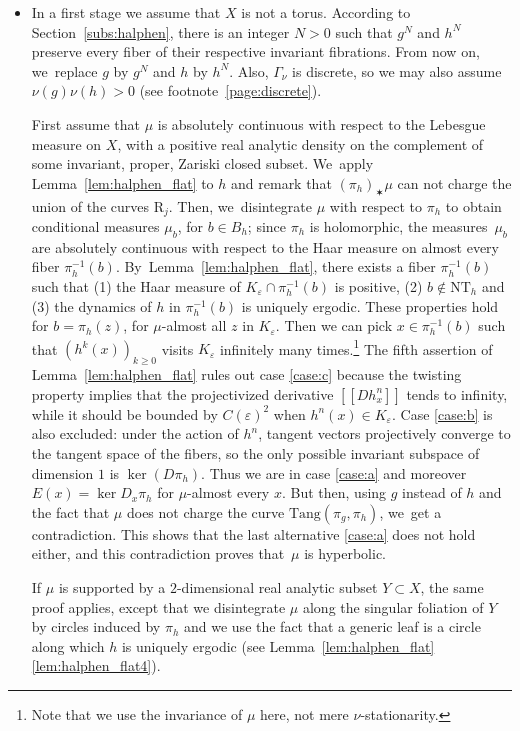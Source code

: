\documentclass[11pt]{article}
\newcommand{\llbracket}{[\![}
\newcommand{\rrbracket}{]\!]}
\let\e\varepsilon
\newcommand{\inv}{^{-1}}
\newcommand{\Tang}{{\mathrm{Tang}}}
\theoremstyle{plain}
\theoremstyle{definition}
\numberwithin{equation}{section}
\begin{document}
\begin{itemize}
\item
In a first stage we assume that $X$ is not a torus. According to Section~\ref{subs:halphen}, there is an integer $N>0$ such that $g^N$ and $h^N$
preserve every fiber of their respective invariant fibrations. From now on, we~replace $g$ by $g^N$ and $h$ by $h^N$. Also, $\Gamma_\nu$ is discrete, so we may also assume $\nu(g)\nu(h)>0$ (see footnote~\ref{page:discrete}).

First assume that $\mu$ is absolutely continuous with respect to the Lebesgue measure on $X$, with a positive real analytic density
on the complement of some invariant, proper, Zariski closed subset. We~apply Lemma~\ref{lem:halphen_flat} to $h$ and remark that
$(\pi_h)_\varstar \mu$ can not charge the union of the curves $\mathrm R_j$. Then, we~disintegrate $\mu$ with respect to $\pi_h$ to obtain
conditional measures $\mu_b$, for $b\in B_h$; since $\pi_h$ is holomorphic, the measures~$\mu_b$ are
absolutely continuous with respect to the Haar measure on almost every fiber $\pi_h^{-1}(b)$. By~Lemma~\ref{lem:halphen_flat},
there exists a fiber $\pi_h\inv(b)$ such that (1) the Haar measure of
$K_\varepsilon \cap \pi_h\inv(b)$ is positive,
(2) $b \notin \mathrm{NT}_h$ and (3)
the dynamics of $h$ in $\pi_h\inv(b)$ is uniquely ergodic. These properties hold for $b=\pi_h(z)$, for $\mu$-almost all $z$ in $K_\e$.
Then we can pick $x\in \pi_h\inv(b)$ such that $(h^{k}(x))_{k\geq 0}$ visits $K_\e$ infinitely many times.\footnote{Note that we use the invariance of $\mu$ here, not mere $\nu$-stationarity.} The fifth assertion of Lemma~\ref{lem:halphen_flat}
rules out case \eqref{case:c} because the twisting property implies that the projectivized derivative $\llbracket Dh^n_x \rrbracket$ tends to infinity, while it should be bounded
by $C(\e)^2$ when $h^n(x)\in K_\e$.
Case \eqref{case:b} is also excluded: under the action of $h^n$, tangent vectors projectively
converge to the tangent space of the fibers, so the only possible invariant subspace of dimension $1$ is $\ker(D\pi_h)$.
Thus we are in case \eqref{case:a} and moreover $E(x) = \ker D_x\pi_h$ for $\mu$-almost every $x$. But then,
using $g$ instead of $h$ and the fact that $\mu$ does not charge the curve $\Tang(\pi_g, \pi_h)$, we~get a contradiction.
This shows that the last alternative \eqref{case:a} does not hold either, and this contradiction proves that~$\mu$ is hyperbolic.

If $\mu$ is supported by a $2$-dimensional real analytic subset $Y\subset X$, the same proof applies,
except that we disintegrate
$\mu$ along the singular foliation of $Y$ by circles induced by $\pi_h$ and we use the fact that a generic leaf is a
circle along which
$h$ is uniquely ergodic (see Lemma~\ref{lem:halphen_flat}\eqref{lem:halphen_flat4}).


\end{itemize}
\end{document}
